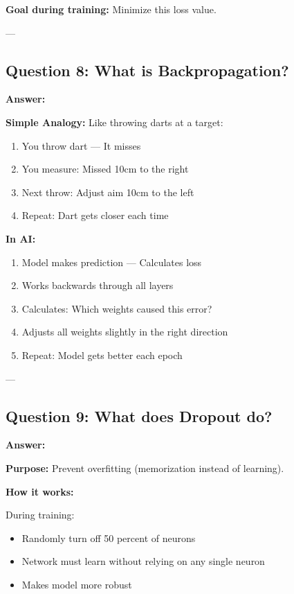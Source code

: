 \documentclass[12pt,a4paper]{article}
\begin{document}
\textbf{Goal during training:} Minimize this loss value.

---

\subsection{Question 8: What is Backpropagation?}

\textbf{Answer:}

\textbf{Simple Analogy:} Like throwing darts at a target:

\begin{enumerate}
    \item You throw dart --- It misses
    \item You measure: Missed 10cm to the right
    \item Next throw: Adjust aim 10cm to the left
    \item Repeat: Dart gets closer each time
\end{enumerate}

\textbf{In AI:}

\begin{enumerate}
    \item Model makes prediction --- Calculates loss
    \item Works backwards through all layers
    \item Calculates: Which weights caused this error?
    \item Adjusts all weights slightly in the right direction
    \item Repeat: Model gets better each epoch
\end{enumerate}

---

\subsection{Question 9: What does Dropout do?}

\textbf{Answer:}

\textbf{Purpose:} Prevent overfitting (memorization instead of learning).

\textbf{How it works:}

During training:
\begin{itemize}
    \item Randomly turn off 50 percent of neurons
    \item Network must learn without relying on any single neuron
    \item Makes model more robust
\end{itemize}
\end{document}
